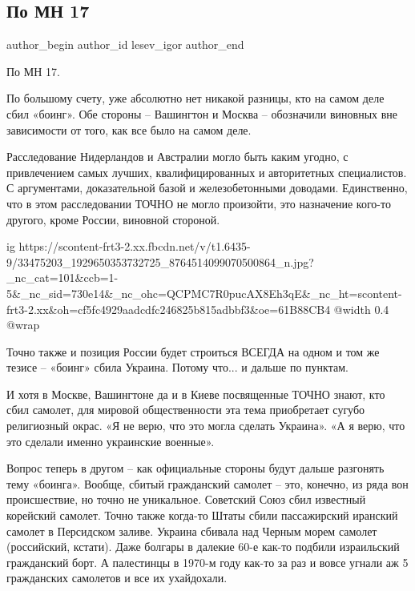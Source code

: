 
 
 
 
 
 
\subsection{По МН 17}
\label{sec:25_05_2018.fb.lesev_igor.1.mh17}
 
\ifcmt
 author_begin
   author_id lesev_igor
 author_end
\fi

По МН 17.

По большому счету, уже абсолютно нет никакой разницы, кто на самом деле сбил
«боинг». Обе стороны – Вашингтон и Москва – обозначили виновных вне зависимости
от того, как все было на самом деле.

Расследование Нидерландов и Австралии могло быть каким угодно, с привлечением
самых лучших, квалифицированных и авторитетных специалистов. С аргументами,
доказательной базой и железобетонными доводами. Единственно, что в этом
расследовании ТОЧНО не могло произойти, это назначение кого-то другого, кроме
России, виновной стороной.

\ifcmt
  ig https://scontent-frt3-2.xx.fbcdn.net/v/t1.6435-9/33475203_1929650353732725_8764514099070500864_n.jpg?_nc_cat=101&ccb=1-5&_nc_sid=730e14&_nc_ohc=QCPMC7R0pucAX8Eh3qE&_nc_ht=scontent-frt3-2.xx&oh=cf5fc4929aadcdfc246825b815adbbf3&oe=61B88CB4
  @width 0.4
  @wrap 
\fi

Точно также и позиция России будет строиться ВСЕГДА на одном и том же тезисе –
«боинг» сбила Украина. Потому что... и дальше по пунктам.

И хотя в Москве, Вашингтоне да и в Киеве посвященные ТОЧНО знают, кто сбил
самолет, для мировой общественности эта тема приобретает сугубо религиозный
окрас. «Я не верю, что это могла сделать Украина». «А я верю, что это сделали
именно украинские военные».

Вопрос теперь в другом – как официальные стороны будут дальше разгонять тему
«боинга». Вообще, сбитый гражданский самолет – это, конечно, из ряда вон
происшествие, но точно не уникальное. Советский Союз сбил известный корейский
самолет. Точно также когда-то Штаты сбили пассажирский иранский самолет в
Персидском заливе. Украина сбивала над Черным морем самолет (российский,
кстати). Даже болгары в далекие 60-е как-то подбили израильский гражданский
борт. А палестинцы в 1970-м году как-то за раз и вовсе угнали аж 5 гражданских
самолетов и все их ухайдохали.

